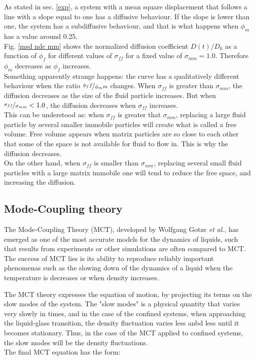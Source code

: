 \documentclass[a4paper,12pt]{article}
\newcommand{\jline}{\vspace{10pt}}
\newcommand{\etal}{\textit{et al.}}
\begin{document}
As stated in sec. \ref{exp}, a system with a mean square displacement that follows a line with a slope equal to one has a diffusive behaviour.
If the slope is lower than one, the system has a subdiffusive behaviour, and that is what happens when $\phi_m$ has a value around 0.25.\\
Fig. \ref{msd ndc mm} shows the normalized diffusion coefficient $D(t)/D_0$ as a function of $\phi_f$ for different values of $\sigma_{ff}$
for a fixed value of $\sigma_{mm}=1.0$. Therefore $\phi_m$ decreases as $\phi_f$ increases.\\
Something apparently strange happens: the curve has a qualitatively different behaviour when the ratio $\nicefrac{\phi_ff}{\phi_mm}$ changes.
When $\sigma_{ff}$ is greater than $\sigma_{mm}$, the diffusion decreases as the size of the fluid particle increases. But when 
$\nicefrac{\sigma_{ff}}{\sigma_{mm}}<1.0$, the diffusion decreases when $\sigma_{ff}$ increases.\\
This can be understood as: when $\sigma_{ff}$ is greater that $\sigma_{mm}$, replacing a large fluid particle by several smaller immobile 
particles will create what is called a free volume. Free volume appears when matrix particles are so close to each other that some of the 
space is not available for fluid to flow in. This is why the diffusion decreases. \\
On the other hand, when $\sigma_{ff}$ is smaller than $\sigma_{mm}$, replacing several small fluid particles with a large matrix immobile 
one will tend to reduce the free space, and increasing the diffusion.

\subsection{Mode-Coupling theory}
\label{mct}

The Mode-Coupling Theory (MCT), developed by Wolfgang Gotze \etal \cite{Bengtzelius1984}, has emerged as one of the most accurate models 
for the dynamics of liquids, such that results from experiments or other simulations are often compared to MCT. The success of MCT lies 
is its ability to reproduce reliably important phenomenas such as the slowing down of the dynamics of a liquid when the temperature is 
decreases or when density increases.\jline

The MCT theory expresses the equation of motion, by projecting its terms on the slow modes of the system. The "slow modes" is a physical 
quantity that varies very slowly in times, and in the case of the confined systems, when approaching the liquid-glass transition, the density
fluctuation varies less anbd less until it becomes stationary. Thus, in the case of the MCT applied to confined systems, the slow modes will
be the density fluctuations.\\
The final MCT equation has the form:
\end{document}
